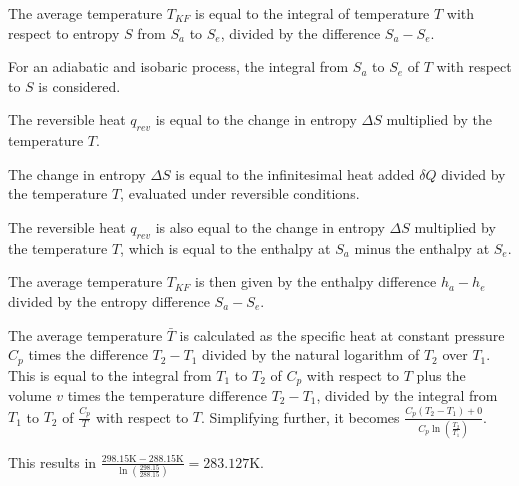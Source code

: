 The average temperature \( T_{KF} \) is equal to the integral of temperature \( T \) with respect to entropy \( S \) from \( S_a \) to \( S_e \), divided by the difference \( S_a - S_e \).

For an adiabatic and isobaric process, the integral from \( S_a \) to \( S_e \) of \( T \) with respect to \( S \) is considered.

The reversible heat \( q_{rev} \) is equal to the change in entropy \( \Delta S \) multiplied by the temperature \( T \).

The change in entropy \( \Delta S \) is equal to the infinitesimal heat added \( \delta Q \) divided by the temperature \( T \), evaluated under reversible conditions.

The reversible heat \( q_{rev} \) is also equal to the change in entropy \( \Delta S \) multiplied by the temperature \( T \), which is equal to the enthalpy at \( S_a \) minus the enthalpy at \( S_e \).

The average temperature \( T_{KF} \) is then given by the enthalpy difference \( h_a - h_e \) divided by the entropy difference \( S_a - S_e \).

The average temperature \( \bar{T} \) is calculated as the specific heat at constant pressure \( C_p \) times the difference \( T_2 - T_1 \) divided by the natural logarithm of \( T_2 \) over \( T_1 \). This is equal to the integral from \( T_1 \) to \( T_2 \) of \( C_p \) with respect to \( T \) plus the volume \( v \) times the temperature difference \( T_2 - T_1 \), divided by the integral from \( T_1 \) to \( T_2 \) of \( \frac{C_p}{T} \) with respect to \( T \). Simplifying further, it becomes \( \frac{C_p (T_2 - T_1) + 0}{C_p \ln \left( \frac{T_2}{T_1} \right)} \).

This results in \( \frac{298.15 \text{K} - 288.15 \text{K}}{\ln \left( \frac{298.15}{288.15} \right)} = 283.127 \text{K} \).
